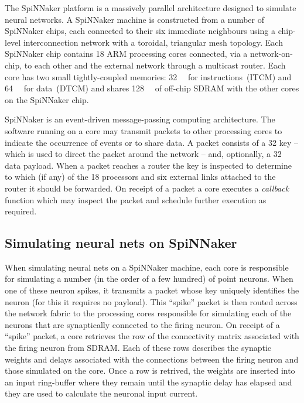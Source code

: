 \documentclass[conference]{IEEEtran}
\begin{document}
The SpiNNaker platform is a massively parallel architecture designed to simulate neural networks. A SpiNNaker machine is constructed from a number of SpiNNaker chips, each connected to their six immediate neighbours using a chip-level interconnection network with a toroidal, triangular mesh topology. Each SpiNNaker chip contains 18 ARM processing cores connected, via a network-on-chip, to each other and the external network through a multicast router. Each core has two small tightly-coupled memories: \SI{32}{\kibi\byte} for instructions~(ITCM) and \SI{64}{\kibi\byte} for data~(DTCM) and shares \SI{128}{\mebi\byte} of off-chip SDRAM with the other cores on the SpiNNaker chip.

SpiNNaker is an event-driven message-passing computing architecture. The software running on a core may transmit packets to other processing cores to indicate the occurrence of events or to share data. A packet consists of a \SI{32}{\bit} key -- which is used to direct the packet around the network -- and, optionally, a \SI{32}{\bit} data payload. When a packet reaches a router the key is inspected to determine to which (if any) of the 18 processors and six external links attached to the router it should be forwarded. On receipt of a packet a core executes a \textit{callback} function which may inspect the packet and schedule further execution as required.

  \subsection{Simulating neural nets on SpiNNaker}
  \label{sef:background/nn}

When simulating neural nets on a SpiNNaker machine, each core is responsible for simulating a number (in the order of a few hundred) of point neurons. When one of these neuron spikes, it transmits a packet whose key uniquely identifies the neuron (for this it requires no payload). This ``spike'' packet is then routed across the network fabric to the processing cores responsible for simulating each of the neurons that are synaptically connected to the firing neuron. On receipt of a ``spike'' packet, a core retrieves the row of the connectivity matrix associated with the firing neuron from SDRAM. Each of these rows describes the synaptic weights and delays associated with the connections between the firing neuron and those simulated on the core. Once a row is retrived, the weights are inserted into an input ring-buffer where they remain until the synaptic delay has elapsed and they are used to calculate the neuronal input current.
\end{document}
